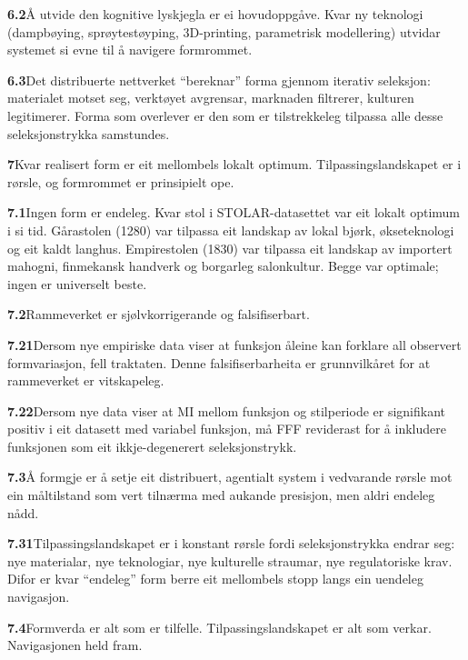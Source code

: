 \documentclass[10pt, a4paper, twocolumn]{article}
\begin{document}
\medskip
\noindent\textbf{6.2}\quad Å utvide den kognitive lyskjegla er ei hovudoppgåve. Kvar ny teknologi (dampbøying, sprøytestøyping, 3D-printing, parametrisk modellering) utvidar systemet si evne til å navigere formrommet.

\medskip
\noindent\textbf{6.3}\quad Det distribuerte nettverket ``bereknar'' forma gjennom iterativ seleksjon: materialet motset seg, verktøyet avgrensar, marknaden filtrerer, kulturen legitimerer. Forma som overlever er den som er tilstrekkeleg tilpassa alle desse seleksjonstrykka samstundes.

\bigskip

\noindent\textbf{7}\quad Kvar realisert form er eit mellombels lokalt optimum. Tilpassingslandskapet er i rørsle, og formrommet er prinsipielt ope.

\medskip
\noindent\textbf{7.1}\quad Ingen form er endeleg. Kvar stol i STOLAR-datasettet var eit lokalt optimum i si tid. Gårastolen (1280) var tilpassa eit landskap av lokal bjørk, økseteknologi og eit kaldt langhus. Empirestolen (1830) var tilpassa eit landskap av importert mahogni, finmekansk handverk og borgarleg salonkultur. Begge var optimale; ingen er universelt beste.

\medskip
\noindent\textbf{7.2}\quad Rammeverket er sjølvkorrigerande og falsifiserbart.

\medskip
\noindent\textbf{7.21}\quad Dersom nye empiriske data viser at funksjon åleine kan forklare all observert formvariasjon, fell traktaten. Denne falsifiserbarheita er grunnvilkåret for at rammeverket er vitskapeleg.

\medskip
\noindent\textbf{7.22}\quad Dersom nye data viser at MI mellom funksjon og stilperiode er signifikant positiv i eit datasett med variabel funksjon, må FFF reviderast for å inkludere funksjonen som eit ikkje-degenerert seleksjonstrykk.

\medskip
\noindent\textbf{7.3}\quad Å formgje er å setje eit distribuert, agentialt system i vedvarande rørsle mot ein måltilstand som vert tilnærma med aukande presisjon, men aldri endeleg nådd.

\medskip
\noindent\textbf{7.31}\quad Tilpassingslandskapet er i konstant rørsle fordi seleksjonstrykka endrar seg: nye materialar, nye teknologiar, nye kulturelle straumar, nye regulatoriske krav. Difor er kvar ``endeleg'' form berre eit mellombels stopp langs ein uendeleg navigasjon.

\medskip
\noindent\textbf{7.4}\quad Formverda er alt som er tilfelle. Tilpassingslandskapet er alt som verkar. Navigasjonen held fram.
\end{document}
